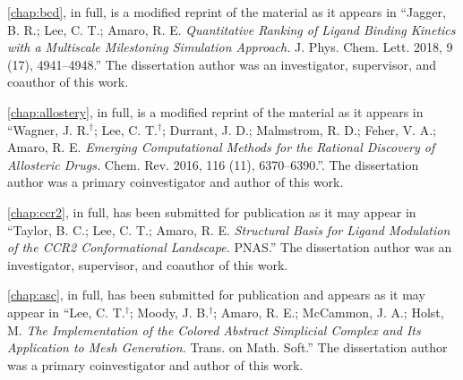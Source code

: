 \begin{frontmatter}
\begin{acknowledgements}
\par \cref{chap:bcd}, in full, is a modified reprint of the material as it appears in ``Jagger, B. R.; Lee, C. T.; Amaro, R. E. \emph{Quantitative Ranking of Ligand Binding Kinetics with a Multiscale Milestoning Simulation Approach.} J. Phys. Chem. Lett. 2018, 9 (17), 4941–4948.''
The dissertation author was an investigator, supervisor, and coauthor of this work.

\par \cref{chap:allostery}, in full, is a modified reprint of the material as it appears in ``Wagner, J. R.$^{\dagger}$; Lee, C. T.$^{\dagger}$; Durrant, J. D.; Malmstrom, R. D.; Feher, V. A.; Amaro, R. E. \emph{Emerging Computational Methods for the Rational Discovery of Allosteric Drugs.} Chem. Rev. 2016, 116 (11), 6370–6390.''.
The dissertation author was a primary coinvestigator and author of this work.

\par \cref{chap:ccr2}, in full, has been submitted for publication as it may appear in ``Taylor, B. C.; Lee, C. T.; Amaro, R. E. \emph{Structural Basis for Ligand Modulation of the CCR2 Conformational Landscape.} PNAS.''
The dissertation author was an investigator, supervisor, and coauthor of this work.

\par \cref{chap:asc}, in full, has been submitted for publication and appears as it may appear in
``Lee, C. T.$^{\dagger}$; Moody, J. B.$^{\dagger}$; Amaro, R. E.; McCammon, J. A.; Holst, M. \emph{The Implementation of the Colored Abstract Simplicial Complex and Its Application to Mesh Generation.} Trans. on Math. Soft.''
The dissertation author was a primary coinvestigator and author of this work.
\end{acknowledgements}



\end{frontmatter}
